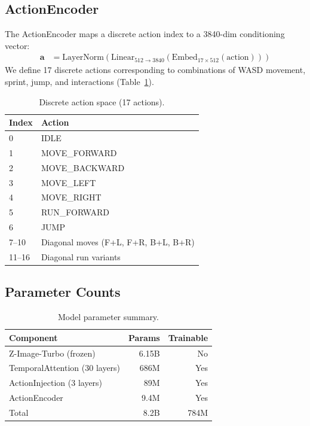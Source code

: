 \documentclass[10pt,twocolumn]{article}
\begin{document}
\subsection{ActionEncoder}

The ActionEncoder maps a discrete action index to a 3840-dim conditioning vector:
\begin{align}
  \mathbf{a} &= \text{LayerNorm}\!\left(\text{Linear}_{512 \to 3840}\!\left(\text{Embed}_{17 \times 512}(\text{action})\right)\right)
\end{align}
We define 17 discrete actions corresponding to combinations of WASD movement, sprint, jump, and interactions (Table~\ref{tab:actions}).

\begin{table}[h]
\centering
\small
\caption{Discrete action space (17 actions).}
\label{tab:actions}
\begin{tabular}{ll}
\toprule
Index & Action \\
\midrule
0 & IDLE \\
1 & MOVE\_FORWARD \\
2 & MOVE\_BACKWARD \\
3 & MOVE\_LEFT \\
4 & MOVE\_RIGHT \\
5 & RUN\_FORWARD \\
6 & JUMP \\
7--10 & Diagonal moves (F+L, F+R, B+L, B+R) \\
11--16 & Diagonal run variants \\
\bottomrule
\end{tabular}
\end{table}

\subsection{Parameter Counts}

\begin{table}[h]
\centering
\small
\caption{Model parameter summary.}
\label{tab:params}
\begin{tabular}{lrr}
\toprule
Component & Params & Trainable \\
\midrule
Z-Image-Turbo (frozen) & 6.15B & No \\
TemporalAttention (30 layers) & 686M & Yes \\
ActionInjection (3 layers) & 89M & Yes \\
ActionEncoder & 9.4M & Yes \\
\midrule
Total & 8.2B & 784M \\
\bottomrule
\end{tabular}
\end{table}
\end{document}
